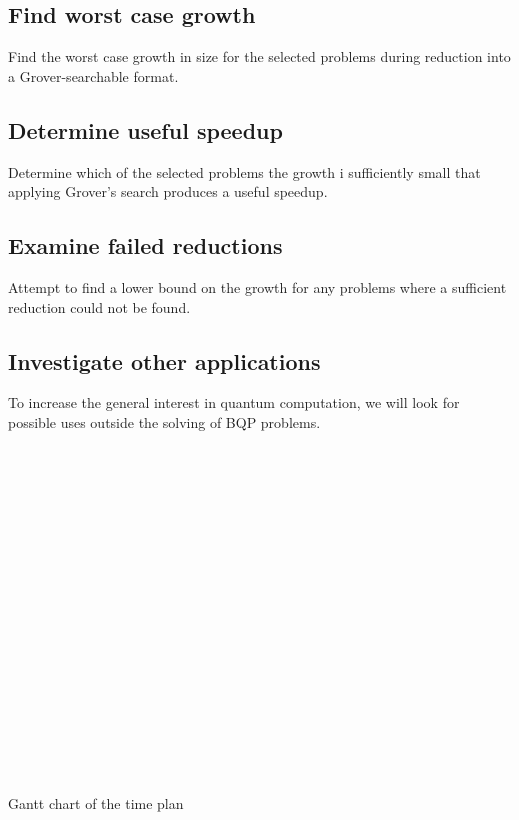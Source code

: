 \documentclass[msc,lith,english]{liuthesis}
\begin{document}
\subsection{Find worst case growth}
Find the worst case growth in size for the selected problems during reduction into a Grover-searchable format.

\subsection{Determine useful speedup}
Determine which of the selected problems the growth i sufficiently small that applying Grover's search produces a useful speedup.

\subsection{Examine failed reductions}
Attempt to find a lower bound on the growth for any problems where a sufficient reduction could not be found.

\subsection{Investigate other applications}
To increase the general interest in quantum computation, we will look for possible uses outside the solving of BQP problems.

\begin{table}
  \begin{ganttchart}{1}{20}
     \\
     \\
     \\
     \\
     \\
     \\
     \\

     \\

     \\
     \\

     \\
     \\
     \\
     \\
     \\
     \\
     \\
  \end{ganttchart}
  \caption{Gantt chart of the time plan}\label{gantt}
\end{table}
\end{document}
